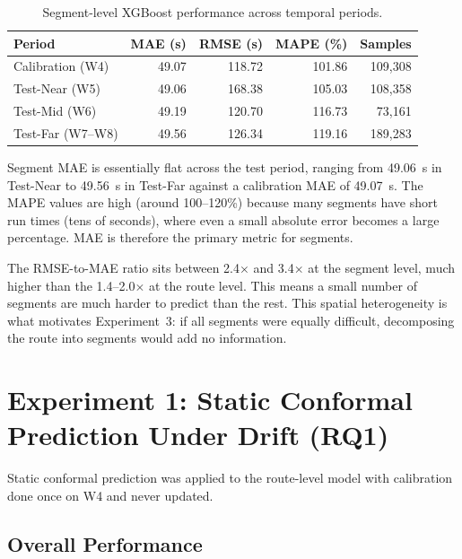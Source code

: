 \documentclass[12pt, a4paper, oneside]{report}
\begin{document}
\begin{table}[H]
\centering
\caption{Segment-level XGBoost performance across temporal periods.}
\label{tab:segment_performance}
\begin{tabular}{lrrrr}
\toprule
\textbf{Period} & \textbf{MAE (s)} & \textbf{RMSE (s)} & \textbf{MAPE (\%)} & \textbf{Samples} \\
\midrule
Calibration (W4) & 49.07 & 118.72 & 101.86 & 109,308 \\
Test-Near (W5) & 49.06 & 168.38 & 105.03 & 108,358 \\
Test-Mid (W6) & 49.19 & 120.70 & 116.73 & 73,161 \\
Test-Far (W7--W8) & 49.56 & 126.34 & 119.16 & 189,283 \\
\bottomrule
\end{tabular}
\end{table}

Segment MAE is essentially flat across the test period, ranging from 49.06~s in Test-Near to 49.56~s in Test-Far against a calibration MAE of 49.07~s. The MAPE values are high (around 100--120\%) because many segments have short run times (tens of seconds), where even a small absolute error becomes a large percentage. MAE is therefore the primary metric for segments.

The RMSE-to-MAE ratio sits between 2.4$\times$ and 3.4$\times$ at the segment level, much higher than the 1.4--2.0$\times$ at the route level. This means a small number of segments are much harder to predict than the rest. This spatial heterogeneity is what motivates Experiment~3: if all segments were equally difficult, decomposing the route into segments would add no information.


\section{Experiment 1: Static Conformal Prediction Under Drift (RQ1)}
\label{sec:exp1_results}

Static conformal prediction was applied to the route-level model with calibration done once on W4 and never updated.

\subsection{Overall Performance}
\end{document}
